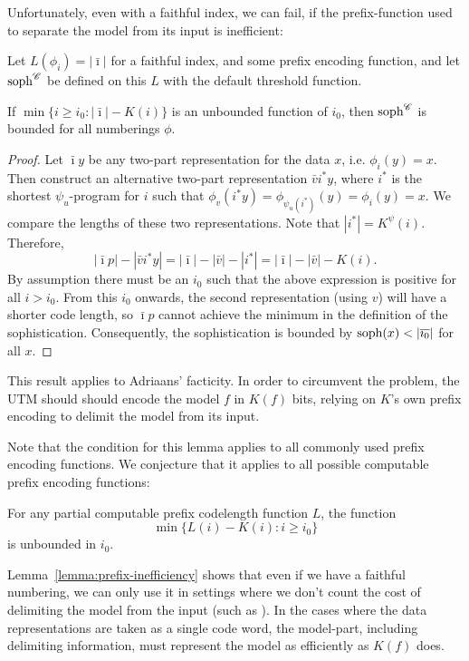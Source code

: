 \documentclass{style/llncs}
\newcommand{\C}{\mathscr C}
\newcommand{\tn}[1]{\textnormal{#1}}
\newcommand{\s}{\tn{soph}}
\begin{document}
Unfortunately, even with a faithful index, we can fail, if the prefix-function used to separate the model from its input is inefficient:

\begin{lemma}
Let $L(\phi_i) = |\bar\imath|$ for a faithful index, and some prefix encoding function, and let $\s^\C$ be defined on this $L$ with the default threshold function.

If $\min\{i\ge i_0:|\bar\imath|-K(i)\}$ is an unbounded function of $i_0$, then $\s^\C$ is bounded for all numberings $\phi$.\label{lemma:prefix-inefficiency}
\end{lemma}
\begin{proof}
Let $\bar\imath y$ be any two-part representation for the data $x$, i.e. $\phi_i(y)=x$. Then construct an alternative two-part representation $\bar vi^* y$, where $i^*$ is the shortest $\psi_u$-program for $i$ such that $\phi_v(i^* y)=\phi_{\psi_u(i^*)}(y) = \phi_i(y)=x$. We compare the lengths of these two representations. Note that $|i^*|=K^\psi(i)$. Therefore,
\[
|\bar\imath p|-|\bar v i^* y| = |\bar\imath|-|\bar v| - |i^*| = |\bar\imath|-|\bar v|-K(i).
\]
By assumption there must be an $i_0$ such that the above expression is positive for all $i>i_0$. From this $i_0$ onwards, the second representation (using $v$) will have a shorter code length, so $\bar\imath p$ cannot achieve the minimum in the definition of the sophistication. Consequently, the sophistication is bounded by $\s(x)<|\overline{\imath_0}|$ for all $x$. 
\end{proof}
This result applies to Adriaans' facticity\cite{adriaans2012facticity}. In order to circumvent the problem, the UTM should should encode the model $f$ in $K(f)$ bits, relying on $K$'s own prefix encoding to delimit the model from its input. 

Note that the condition for this lemma applies to all commonly used prefix encoding functions. We conjecture that it applies to all possible computable prefix encoding functions:

\begin{conjecture}
For any partial computable prefix codelength function $L$, the function
\[
\min\{L(i)-K(i):i\ge i_0\}
\]
is unbounded in $i_0$.
\end{conjecture}

Lemma~\ref{lemma:prefix-inefficiency} shows that even if we have a faithful numbering, we can only use it in settings where we don't count the cost of delimiting the model from the input (such as \cite{koppelSoph1988}). In the cases where the data representations are taken as a single code word, the model-part, including delimiting information, must represent the model as efficiently as $K(f)$ does.  
\end{document}
